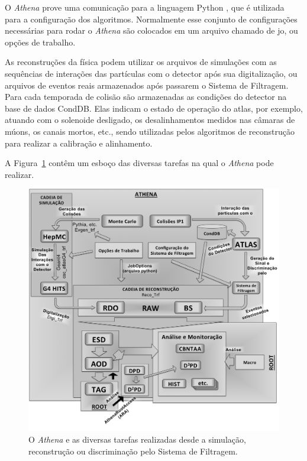 O \emph{Athena} prove uma comunicação para a
linguagem Python \cite{webPython}, que é utilizada para a configuração dos algoritmos.
Normalmente esse conjunto de configurações necessárias para rodar o \emph{Athena} são 
colocados em um arquivo chamado de \gls{jo}, ou opções de trabalho.

As reconstruções da física podem utilizar os arquivos de simulações com as sequências de
interações das partículas com o detector após sua digitalização, ou arquivos de eventos
reais armazenados após passarem o Sistema de Filtragem. Para cada temporada de
colisão são armazenadas as condições do detector na base de dados CondDB.
Elas indicam o estado de operação do \gls{atlas}, por exemplo, atuando com o
solenoide desligado, os desalinhamentos medidos nas câmaras de múons, os canais
mortos, etc., sendo utilizadas pelos algoritmos de reconstrução 
para realizar a calibração e alinhamento.

A Figura~\ref{fig:cadeia_athena} contêm um esboço das diversas tarefas na qual o
\emph{Athena} pode realizar.

\begin{figure}[h!t]
\centering
\includegraphics[width=\textwidth]{imagens/cadeia_athena.png}
\caption{O \emph{Athena} e as diversas tarefas realizadas desde a simulação,
reconstrução ou discriminação pelo Sistema de Filtragem.}
\label{fig:cadeia_athena}
\end{figure}

